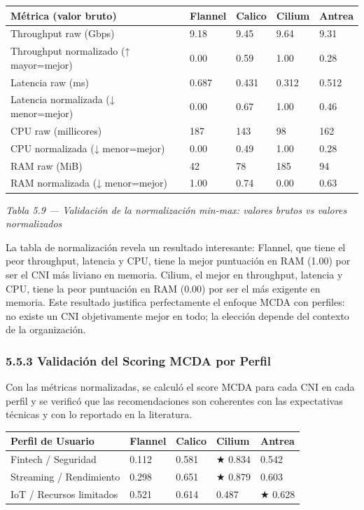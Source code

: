 \documentclass[journal]{IEEEtran}
\begin{document}
\begin{table}[htbp]
\centering
\scriptsize
\begin{tabularx}{\textwidth}{|Y|Y|Y|Y|Y|}
\hline
\textbf{Métrica (valor bruto)} & \textbf{Flannel} & \textbf{Calico} & \textbf{Cilium} & \textbf{Antrea} \\
\hline
Throughput raw (Gbps) & 9.18 & 9.45 & 9.64 & 9.31 \\
Throughput normalizado (↑ mayor=mejor) & 0.00 & 0.59 & 1.00 & 0.28 \\
Latencia raw (ms) & 0.687 & 0.431 & 0.312 & 0.512 \\
Latencia normalizada (↓ menor=mejor) & 0.00 & 0.67 & 1.00 & 0.46 \\
CPU raw (millicores) & 187 & 143 & 98 & 162 \\
CPU normalizada (↓ menor=mejor) & 0.00 & 0.49 & 1.00 & 0.28 \\
RAM raw (MiB) & 42 & 78 & 185 & 94 \\
RAM normalizada (↓ menor=mejor) & 1.00 & 0.74 & 0.00 & 0.63 \\
\hline
\end{tabularx}
\end{table}

\begin{center}\emph{\emph{Tabla 5.9 --- Validación de la normalización min-max: valores brutos vs valores normalizados}}\end{center}

La tabla de normalización revela un resultado interesante: Flannel, que tiene el peor throughput, latencia y CPU, tiene la mejor puntuación en RAM (1.00) por ser el CNI más liviano en memoria. Cilium, el mejor en throughput, latencia y CPU, tiene la peor puntuación en RAM (0.00) por ser el más exigente en memoria. Este resultado justifica perfectamente el enfoque MCDA con perfiles: no existe un CNI objetivamente mejor en todo; la elección depende del contexto de la organización.

\subsubsection{5.5.3 Validación del Scoring MCDA por Perfil}

Con las métricas normalizadas, se calculó el score MCDA para cada CNI en cada perfil y se verificó que las recomendaciones son coherentes con las expectativas técnicas y con lo reportado en la literatura.

\begin{table}[htbp]
\centering
\scriptsize
\begin{tabularx}{\textwidth}{|Y|Y|Y|Y|Y|}
\hline
\textbf{Perfil de Usuario} & \textbf{Flannel} & \textbf{Calico} & \textbf{Cilium} & \textbf{Antrea} \\
\hline
Fintech / Seguridad & 0.112 & 0.581 & ★ 0.834 & 0.542 \\
Streaming / Rendimiento & 0.298 & 0.651 & ★ 0.879 & 0.603 \\
IoT / Recursos limitados & 0.521 & 0.614 & 0.487 & ★ 0.628 \\
\hline
\end{tabularx}
\end{table}
\end{document}
